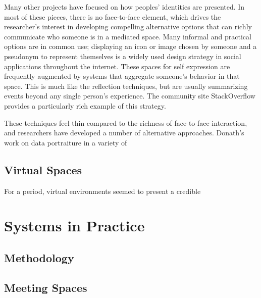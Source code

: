 \documentclass{tufte-handout}
\begin{document}
Many other projects have focused on how peoples' identities are presented. In most of these pieces, there is no face-to-face element, which drives the researcher's interest in developing compelling alternative options that can richly communicate who someone is in a mediated space. Many informal and practical options are in common use; displaying an icon or image chosen by someone and a pseudonym to represent themselves is a widely used design strategy in social applications throughout the internet. These spaces for self expression are frequently augmented by systems that aggregate someone's behavior in that space. This is much like the reflection techniques, but are usually summarizing events beyond any single person's experience. The community site StackOverflow \cite{stack_overflow} provides a particularly rich example of this strategy.


These techniques feel thin compared to the richness of face-to-face interaction, and researchers have developed a number of alternative approaches. Donath's work on data portraiture in a variety of 







\subsection{Virtual Spaces}

For a period, virtual environments seemed to present a credible 


\section{Systems in Practice}

\subsection{Methodology}

\subsection{Meeting Spaces}
\end{document}

